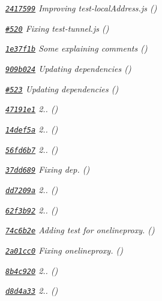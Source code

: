 \begin{DoxyItemize}
\item {\itshape \href{https://github.com/mikeal/request/commit/24175993f6c362f7fca5965feb0a11756f00baf3}{\tt 2417599} Improving test-\/local\+Address.\+js ()}
\item {\itshape \href{https://github.com/mikeal/request/pull/520}{\tt \#520} Fixing test-\/tunnel.\+js ()}
\item {\itshape \href{https://github.com/mikeal/request/commit/1e37f1bea45174e09e6450bc71dfc081c8cd94de}{\tt 1e37f1b} Some explaining comments ()}
\item {\itshape \href{https://github.com/mikeal/request/commit/909b024619c9e47f615749661d610cccd8421d80}{\tt 909b024} Updating dependencies ()}
\item {\itshape \href{https://github.com/mikeal/request/pull/523}{\tt \#523} Updating dependencies ()}
\item {\itshape \href{https://github.com/mikeal/request/commit/47191e1a5e29714fb0c5f8b2162b2971570df644}{\tt 47191e1} 2.. ()}
\item {\itshape \href{https://github.com/mikeal/request/commit/14def5af5903d03f66bd6c9be534e6b76f47c063}{\tt 14def5a} 2.. ()}
\item {\itshape \href{https://github.com/mikeal/request/commit/56fd6b7ec6da162894df0809126d688f30900d25}{\tt 56fd6b7} 2.. ()}
\item {\itshape \href{https://github.com/mikeal/request/commit/37dd68989670f8937b537579a4299d9649b8aa16}{\tt 37dd689} Fixing dep. ()}
\item {\itshape \href{https://github.com/mikeal/request/commit/dd7209a84dd40afe87db31c6ab66885e2015cb8f}{\tt dd7209a} 2.. ()}
\item {\itshape \href{https://github.com/mikeal/request/commit/62f3b9203690d4ad34486fc506fc78a1c9971e03}{\tt 62f3b92} 2.. ()}
\item {\itshape \href{https://github.com/mikeal/request/commit/74c6b2e315872980ee9a9a000d25e724138f28b1}{\tt 74c6b2e} Adding test for onelineproxy. ()}
\item {\itshape \href{https://github.com/mikeal/request/commit/2a01cc082f544647f7176a992e02668519a694be}{\tt 2a01cc0} Fixing onelineproxy. ()}
\item {\itshape \href{https://github.com/mikeal/request/commit/8b4c9203adb372f2ee99b1b012406b482b27c68d}{\tt 8b4c920} 2.. ()}
\item {\itshape \href{https://github.com/mikeal/request/commit/d8d4a3311d8d31df88fa8a2ab3265872e5cb97ae}{\tt d8d4a33} 2.. ()}

\end{DoxyItemize}

